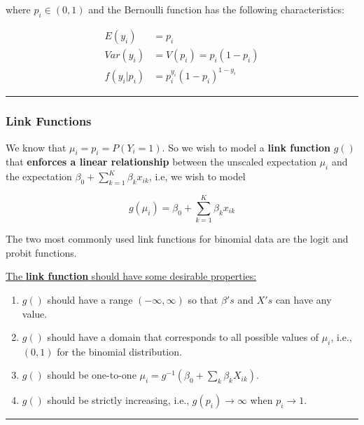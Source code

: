 \documentclass[
  letterpaper,
  DIV=11,
  numbers=noendperiod]{scrreprt}
\providecommand{\tightlist}{%
  \setlength{\itemsep}{0pt}\setlength{\parskip}{0pt}}\usepackage{longtable,booktabs,array}
\begin{document}
where \(p_i \in (0,1)\) and the Bernoulli function has the following
characteristics:

\[
\begin{align*}
E(y_i) & = p_i\\
Var(y_i) & =V(p_i) = p_i (1- p_i)\\
f(y_i|p_i) & = p_i ^{y_i} (1-p_i)^{1-y_i}
\end{align*}
\]

\begin{center}\rule{0.5\linewidth}{0.5pt}\end{center}

\hypertarget{link-functions}{%
\subsubsection*{Link Functions}\label{link-functions}}

We know that \(\mu_i = p_i = P(Y_i=1)\). So we wish to model a
\textbf{link function} \(g()\) that \textbf{enforces a linear
relationship} between the unscaled expectation \(\mu_i\) and the
expectation \(\beta_0 + \sum_{k=1}^K \beta_k x_{ik}\), i.e, we wish to
model

\[
g(\mu_i) = \beta_0 + \sum_{k=1}^K \beta_k x_{ik}
\]

The two most commonly used link functions for binomial data are the
logit and probit functions.

\ul{The \textbf{link function} should have some desirable properties:}

\begin{enumerate}
\def\labelenumi{\arabic{enumi}.}
\tightlist
\item
  \(g()\) should have a range \((-\infty, \infty)\) so that \(\beta's\)
  and \(X's\) can have any value.
\item
  \(g()\) should have a domain that corresponds to all possible values
  of \(\mu_i\), i.e., \((0,1)\) for the binomial distribution.
\item
  \(g()\) should be one-to-one
  \(\mu_i = g^{-1}(\beta_0 + \sum_k \beta_k X_{ik})\).
\item
  \(g()\) should be strictly increasing, i.e.,
  \(g(p_i) \rightarrow \infty\) when \(p_i \rightarrow 1\).
\end{enumerate}

\begin{center}\rule{0.5\linewidth}{0.5pt}\end{center}
\end{document}
